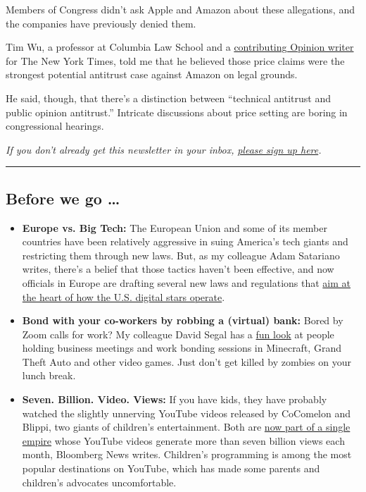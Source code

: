 Members of Congress didn't ask Apple and Amazon about these allegations,
and the companies have previously denied them.

Tim Wu, a professor at Columbia Law School and a
\href{https://www.nytimes.com/by/tim-wu}{contributing Opinion writer}
for The New York Times, told me that he believed those price claims were
the strongest potential antitrust case against Amazon on legal grounds.

He said, though, that there's a distinction between ``technical
antitrust and public opinion antitrust.'' Intricate discussions about
price setting are boring in congressional hearings.

\emph{If you don't already get this newsletter in your inbox,}
\href{https://www.nytimes.com/newsletters/signup/OT}{\emph{please sign
up here}}\emph{.}

\begin{center}\rule{0.5\linewidth}{\linethickness}\end{center}

\hypertarget{before-we-go-}{%
\subsection{Before we go \ldots{}}\label{before-we-go-}}

\begin{itemize}
\item
  \textbf{Europe vs. Big Tech:} The European Union and some of its
  member countries have been relatively aggressive in suing America's
  tech giants and restricting them through new laws. But, as my
  colleague Adam Satariano writes, there's a belief that those tactics
  haven't been effective, and now officials in Europe are drafting
  several new laws and regulations that
  \href{https://www.nytimes.com/2020/07/30/technology/europe-new-phase-tech-amazon-apple-facebook-google.html}{aim
  at the heart of how the U.S. digital stars operate}.
\item
  \textbf{Bond with your co-workers by robbing a (virtual) bank:} Bored
  by Zoom calls for work? My colleague David Segal has a
  \href{https://www.nytimes.com/2020/07/31/business/hey-you-free-on-friday-for-a-meeting-and-a-bank-heist.html}{fun
  look} at people holding business meetings and work bonding sessions in
  Minecraft, Grand Theft Auto and other video games. Just don't get
  killed by zombies on your lunch break.
\item
  \textbf{Seven. Billion. Video. Views:} If you have kids, they have
  probably watched the slightly unnerving YouTube videos released by
  CoComelon and Blippi, two giants of children's entertainment. Both are
  \href{https://www.bloomberg.com/news/articles/2020-07-30/blippi-cocomelon-purchased-by-kids-media-giant-moonbug}{now
  part of a single empire} whose YouTube videos generate more than seven
  billion views each month, Bloomberg News writes. Children's
  programming is among the most popular destinations on YouTube, which
  has made some parents and children's advocates uncomfortable.
\end{itemize}

